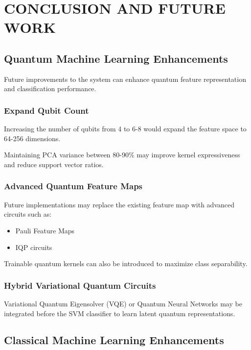 \chapter{CONCLUSION AND FUTURE WORK}

\section{Quantum Machine Learning Enhancements}

Future improvements to the system can enhance quantum feature representation and classification performance.

\subsection{Expand Qubit Count}

Increasing the number of qubits from 4 to 6-8 would expand the feature space to 64-256 dimensions.

Maintaining PCA variance between 80-90\% may improve kernel expressiveness and reduce support vector ratios.

\subsection{Advanced Quantum Feature Maps}

Future implementations may replace the existing feature map with advanced circuits such as:

\begin{itemize}
\item Pauli Feature Maps
\item IQP circuits
\end{itemize}

Trainable quantum kernels can also be introduced to maximize class separability.

\subsection{Hybrid Variational Quantum Circuits}

Variational Quantum Eigensolver (VQE) or Quantum Neural Networks may be integrated before the SVM classifier to learn latent quantum representations.

\section{Classical Machine Learning Enhancements}

